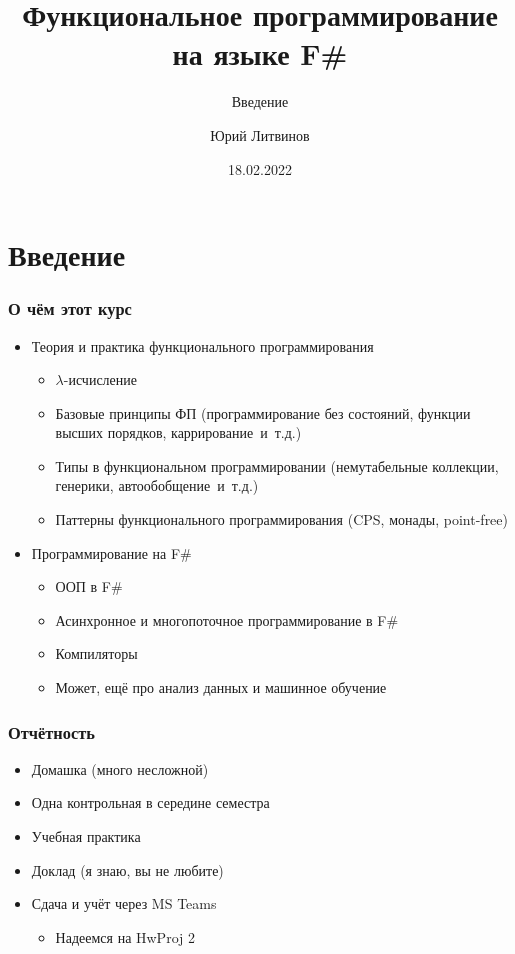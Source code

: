 \documentclass[xetex,mathserif,serif]{beamer}
\title{Функциональное программирование на языке F\#}
\subtitle{Введение}
\author{Юрий Литвинов}
\date{18.02.2022}
\begin{document}
    
    \frame{\titlepage}
    
    \section{Введение}
    
    \begin{frame}
        \frametitle{О чём этот курс}
        \begin{itemize}
            \item Теория и практика функционального программирования
            \begin{itemize}
                \item $\lambda$-исчисление
                \item Базовые принципы ФП (программирование без состояний, функции высших порядков, каррирование~и~т.д.)
                \item Типы в функциональном программировании (немутабельные коллекции,
                    генерики, автообобщение~и~т.д.)
                \item Паттерны функционального программирования (CPS, монады, point-free)
            \end{itemize}
            \item Программирование на F\# 
            \begin{itemize}
                \item ООП в F\#
                \item Асинхронное и многопоточное программирование в F\#
                \item Компиляторы
                \item Может, ещё про анализ данных и машинное обучение
            \end{itemize}
        \end{itemize}
    \end{frame}

    \begin{frame}
        \frametitle{Отчётность}
        \begin{itemize}
            \item Домашка (много несложной)
            \item Одна контрольная в середине семестра
            \item Учебная практика
            \item Доклад (я знаю, вы не любите)
            \item Сдача и учёт через MS Teams 
            \begin{itemize}
                \item Надеемся на HwProj 2
            \end{itemize}
        \end{itemize}
    \end{frame}
\end{document}
